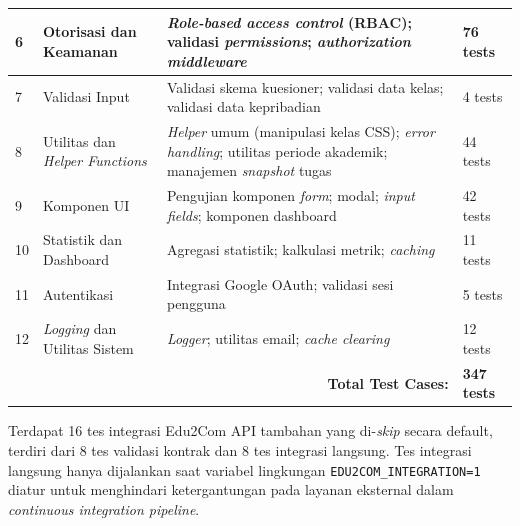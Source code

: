 \begin{longtable}{|p{}|p{}|p{}|p{}|}
	\hline
	6                                                & Otorisasi dan Keamanan                 & \textit{Role-based access control} (RBAC); validasi \textit{permissions}; \textit{authorization middleware}                        & 76 tests             \\
	\hline
	7                                                & Validasi Input                         & Validasi skema kuesioner; validasi data kelas; validasi data kepribadian                                                           & 4 tests              \\
	\hline
	8                                                & Utilitas dan \textit{Helper Functions} & \textit{Helper} umum (manipulasi kelas CSS); \textit{error handling}; utilitas periode akademik; manajemen \textit{snapshot} tugas & 44 tests             \\
	\hline
	9                                                & Komponen UI                            & Pengujian komponen \textit{form}; modal; \textit{input fields}; komponen dashboard                                                 & 42 tests             \\
	\hline
	10                                               & Statistik dan Dashboard                & Agregasi statistik; kalkulasi metrik; \textit{caching}                                                                             & 11 tests             \\
	\hline
	11                                               & Autentikasi                            & Integrasi Google OAuth; validasi sesi pengguna                                                                                     & 5 tests              \\
	\hline
	12                                               & \textit{Logging} dan Utilitas Sistem   & \textit{Logger}; utilitas email; \textit{cache clearing}                                                                           & 12 tests             \\
	\hline
	\multicolumn{3}{|r|}{\textbf{Total Test Cases:}} & \textbf{347 tests}                                                                                                                                                                                 \\
	\hline
\end{longtable}

\noindent
Terdapat 16 tes integrasi Edu2Com API tambahan yang di-\textit{skip} secara default, terdiri dari 8 tes validasi kontrak dan 8 tes integrasi langsung. Tes integrasi langsung hanya dijalankan saat variabel lingkungan \texttt{EDU2COM\_INTEGRATION=1} diatur untuk menghindari ketergantungan pada layanan eksternal dalam \textit{continuous integration pipeline}.

